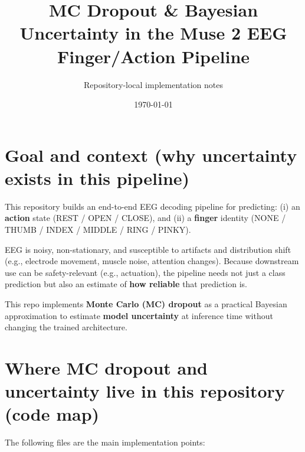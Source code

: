 \documentclass[11pt]{article}
\title{MC Dropout \& Bayesian Uncertainty in the Muse 2 EEG Finger/Action Pipeline}
\author{Repository-local implementation notes}
\date{\today}
\begin{document}
\maketitle

\section{Goal and context (why uncertainty exists in this pipeline)}

This repository builds an end-to-end EEG decoding pipeline for predicting:
(i) an \textbf{action} state (REST / OPEN / CLOSE), and
(ii) a \textbf{finger} identity (NONE / THUMB / INDEX / MIDDLE / RING / PINKY).

EEG is noisy, non-stationary, and susceptible to artifacts and distribution shift (e.g., electrode movement, muscle noise, attention changes).
Because downstream use can be safety-relevant (e.g., actuation), the pipeline needs not just a class prediction but also an estimate of \textbf{how reliable} that prediction is.

This repo implements \textbf{Monte Carlo (MC) dropout} as a practical Bayesian approximation to estimate \textbf{model uncertainty} at inference time without changing the trained architecture.

\section{Where MC dropout and uncertainty live in this repository (code map)}

The following files are the main implementation points:
\end{document}
